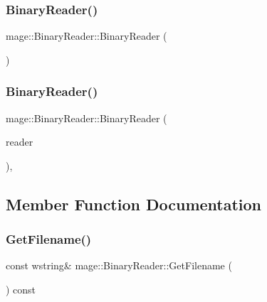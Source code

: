 \subsubsection{\texorpdfstring{Binary\+Reader()}{BinaryReader()}\hspace{0.1cm}{\footnotesize\ttfamily [1/2]}}
{\footnotesize\ttfamily mage\+::\+Binary\+Reader\+::\+Binary\+Reader (\begin{DoxyParamCaption}{ }\end{DoxyParamCaption})\hspace{0.3cm}{\ttfamily [protected]}}

\hypertarget{classmage_1_1_binary_reader_a8c1ff948f1d056439f3d8cc37d7f507c}{}\label{classmage_1_1_binary_reader_a8c1ff948f1d056439f3d8cc37d7f507c} 
\subsubsection{\texorpdfstring{Binary\+Reader()}{BinaryReader()}\hspace{0.1cm}{\footnotesize\ttfamily [2/2]}}
{\footnotesize\ttfamily mage\+::\+Binary\+Reader\+::\+Binary\+Reader (\begin{DoxyParamCaption}\item[{const \hyperlink{classmage_1_1_binary_reader}{Binary\+Reader} \&}]{reader }\end{DoxyParamCaption})\hspace{0.3cm}{\ttfamily [private]}, {\ttfamily [delete]}}



\subsection{Member Function Documentation}
\hypertarget{classmage_1_1_binary_reader_a10a0ec56fe7f8e63964ffca2afe019a3}{}\label{classmage_1_1_binary_reader_a10a0ec56fe7f8e63964ffca2afe019a3} 
\subsubsection{\texorpdfstring{Get\+Filename()}{GetFilename()}}
{\footnotesize\ttfamily const wstring\& mage\+::\+Binary\+Reader\+::\+Get\+Filename (\begin{DoxyParamCaption}{ }\end{DoxyParamCaption}) const}

